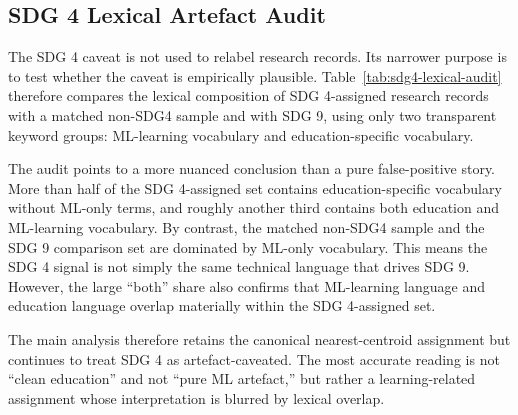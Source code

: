 \documentclass[12pt,a4paper]{article}
\begin{document}
\begin{table}[ht]
\centering
\small
\caption{Policy source-family sensitivity diagnostic. Coverage rankings are document-weighted within each source family. Mean semantic gap is the mean valid within-SDG research--policy gap for that family using the canonical chunk cap.}
\label{tab:policy-source-family-sensitivity}
\resizebox{\textwidth}{!}{%

}
\end{table}

\subsection{SDG 4 Lexical Artefact Audit}
\label{app:sdg4-lexical-audit}

The SDG 4 caveat is not used to relabel research records. Its narrower purpose is to test whether the caveat is empirically plausible. Table~\ref{tab:sdg4-lexical-audit} therefore compares the lexical composition of SDG 4-assigned research records with a matched non-SDG4 sample and with SDG 9, using only two transparent keyword groups: ML-learning vocabulary and education-specific vocabulary.

The audit points to a more nuanced conclusion than a pure false-positive story. More than half of the SDG 4-assigned set contains education-specific vocabulary without ML-only terms, and roughly another third contains both education and ML-learning vocabulary. By contrast, the matched non-SDG4 sample and the SDG 9 comparison set are dominated by ML-only vocabulary. This means the SDG 4 signal is not simply the same technical language that drives SDG 9. However, the large ``both'' share also confirms that ML-learning language and education language overlap materially within the SDG 4-assigned set.

The main analysis therefore retains the canonical nearest-centroid assignment but continues to treat SDG 4 as artefact-caveated. The most accurate reading is not ``clean education'' and not ``pure ML artefact,'' but rather a learning-related assignment whose interpretation is blurred by lexical overlap.

\begin{table}[ht]
\centering
\small
\caption{SDG 4 lexical artefact audit. The audit is not used to reassign SDGs. It only checks whether SDG 4-assigned research is disproportionately dominated by machine-learning vocabulary, education vocabulary, or both.}
\label{tab:sdg4-lexical-audit}
\resizebox{\textwidth}{!}{%

}
\end{table}
\end{document}
